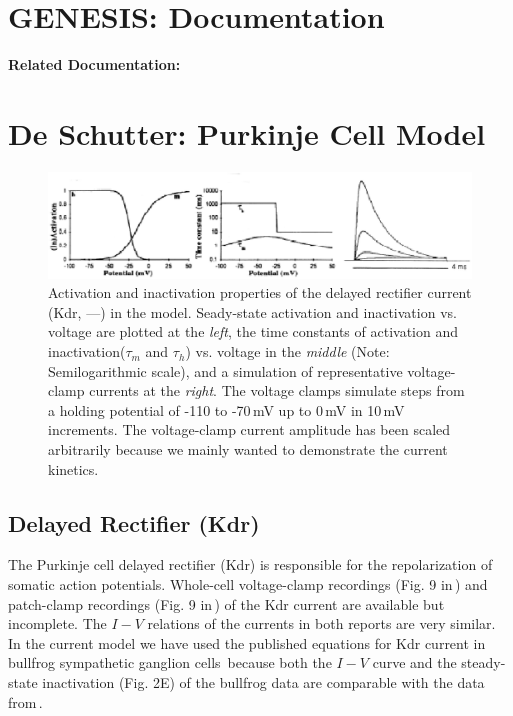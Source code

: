 \documentclass[12pt]{article}
\begin{document}
\section*{GENESIS: Documentation}

{\bf Related Documentation:}

\section*{De Schutter: Purkinje Cell Model}

\begin{figure}[h]
\centering
   \includegraphics[scale=0.75]{figures/DS1.2E1.eps}
   \caption{Activation and inactivation properties of the delayed rectifier current (Kdr, ---) in the model. Seady-state activation and inactivation vs. voltage are plotted at the {\em left}, the time constants of activation and inactivation($\tau_m$ and $\tau_h$) vs. voltage in the {\em middle} (Note: Semilogarithmic scale), and a simulation of representative voltage-clamp currents at the {\em right}.  The voltage clamps simulate steps from a holding potential of -110 to -70\,mV up to 0\,mV in 10\,mV increments. The voltage-clamp current amplitude has been scaled arbitrarily because we mainly wanted to demonstrate the current kinetics.}
   \label{fig:DS1.2E}
\end{figure}

\subsection*{Delayed Rectifier (Kdr)}

The Purkinje cell delayed rectifier (Kdr) is responsible for the repolarization of somatic action potentials. Whole-cell voltage-clamp recordings (Fig. 9 in\,\cite{Hirano:1989uq}) and patch-clamp recordings (Fig. 9 in\,\cite{Gahwiler:1989fk}) of the Kdr current are available but incomplete. The $I-V$ relations of the currents in both reports are very similar. In the current model we have used the published equations for Kdr current in bullfrog sympathetic ganglion cells\,\cite{Yamada-W:1989bs} because both the $I-V$ curve and the steady-state inactivation (Fig. 2E) of the bullfrog data are comparable with the data from\,\cite{Hirano:1989uq}.



\end{document}
